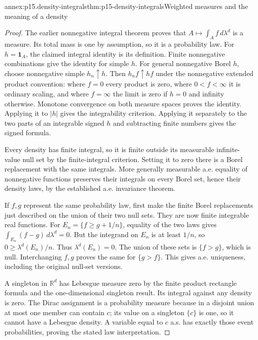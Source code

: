 \begin{annexitem}{annex:p15.density-integrals}{thm:p15-density-integrals}{Weighted measures and the meaning of a density}
\begin{proof}
The earlier nonnegative integral theorem proves that
\(A\mapsto\int_A f\,d\lambda^d\) is a measure. Its total
mass is one by assumption, so it is a probability law. For
\(h=\mathbf1_A\), the claimed integral identity is its definition.
Finite nonnegative combinations give the identity for simple \(h\).
For general nonnegative Borel \(h\), choose nonnegative simple
\(h_n\uparrow h\). Then \(h_nf\uparrow hf\) under the
nonnegative extended product convention: where \(f=0\) every
product is zero, where \(0<f<\infty\) it is ordinary scaling,
and where \(f=\infty\) the limit is zero if \(h=0\) and
infinity otherwise. Monotone convergence on both measure spaces
proves the identity. Applying it to \(|h|\) gives the integrability
criterion. Applying it separately to the two parts of an integrable
signed \(h\) and subtracting finite numbers gives the signed formula.

Every density has finite integral, so it is finite outside its
measurable infinite-value null set by the finite-integral criterion.
Setting it to zero there is a Borel replacement with the same
integrals. More generally measurable a.e. equality of nonnegative
functions preserves their integrals on every Borel set, hence their
density laws, by the established a.e. invariance theorem.

If \(f,g\) represent the same probability law, first make the
finite Borel replacements just described on the union of their two
null sets. They are now finite integrable real functions. For
\(E_n=\{f\geq g+1/n\}\), equality of the two laws gives
\(\int_{E_n}(f-g)\,d\lambda^d=0\). But the integrand on
\(E_n\) is at least \(1/n\), so
\(0\geq\lambda^d(E_n)/n\). Thus \(\lambda^d(E_n)=0\).
The union of these sets is \(\{f>g\}\), which is null.
Interchanging \(f,g\) proves the same for \(\{g>f\}\).
This gives a.e. uniqueness, including the original null-set versions.

A singleton in \(\mathbb R^d\) has Lebesgue measure zero by
the finite product rectangle formula and the one-dimensional
singleton result. Its integral against any density is zero.
The Dirac assignment is a probability measure because in a disjoint
union at most one member can contain \(c\); its value on a
singleton \(\{c\}\) is one, so it cannot have a Lebesgue
density. A variable equal to \(c\) a.s. has exactly those
event probabilities, proving the stated law interpretation.
\end{proof}
\end{annexitem}

